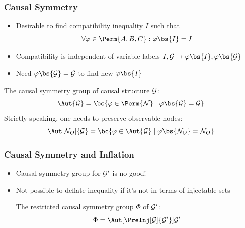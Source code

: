 \documentclass[
    hyperref={bookmarks=false},%
    xcolor={dvipsnames},
]{beamer}
\renewcommand{\term}[1]{\textcolor{Mahogany}{#1}}
\begin{document}
\begin{frame}
    \frametitle{Causal Symmetry}
    \begin{itemize}
        \item Desirable to find compatibility inequality $I$ such that
        \[ \forall \varphi \in \Perm{A,B,C} : \varphi\bs{I} = I \]
        \item Compatibility is independent of variable labels $I, \graph \to \varphi\bs{I}, \varphi\bs{\graph}$
        \item Need $\varphi\bs{\graph} = \graph$ to find new $\varphi\bs{I}$
    \end{itemize}
    \begin{definition}
        The \term{causal symmetry group} of causal structure $\mathcal{G}$:
        \[ \Aut{\graph} = \bc{\varphi \in \Perm{\nodes} \mid \varphi\bs{\graph} = \graph} \]
        Strictly speaking, one needs to preserve observable nodes:
        \[ \Aut[\nodes_O]{\graph} = \bc{\varphi \in \Aut{\graph} \mid \varphi\bs{\nodes_O} = \nodes_O} \]
    \end{definition}
\end{frame}

\begin{frame}
    \frametitle{Causal Symmetry and Inflation}
    \begin{itemize}
        \item Causal symmetry group for $\mathcal{G}'$ is no good!
        \item Not possible to deflate inequality if it's not in terms of injectable sets
        \begin{definition}
            The \term{restricted causal symmetry group} $\Phi$ of $\mathcal{G}'$:
            \[ \Phi = \Aut[\PreInj[\graph]{\graph'}]{\graph'} \]
        \end{definition}
    \end{itemize}
\end{frame}
\end{document}
